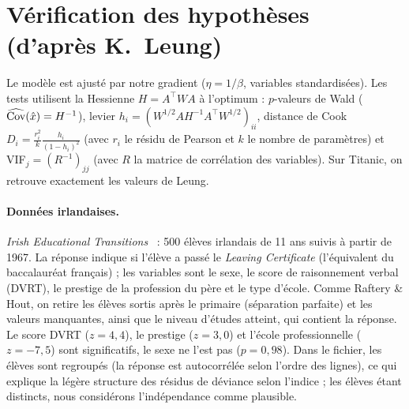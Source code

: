 \documentclass[a4paper,11pt]{article}
\begin{document}
\section{Vérification des hypothèses (d'après K.~Leung)}
Le modèle est ajusté par notre gradient ($\eta=1/\beta$, variables standardisées). Les tests utilisent la Hessienne
$H=A^\top WA$ à l'optimum : $p$-valeurs de Wald ($\widehat{\rm Cov}(\hat x)=H^{-1}$), levier
$h_i=(W^{1/2}AH^{-1}A^\top W^{1/2})_{ii}$, distance de Cook $D_i=\frac{r_i^2}{k}\frac{h_i}{(1-h_i)^2}$ (avec
$r_i$ le résidu de Pearson et $k$ le nombre de paramètres) et VIF$_j=(R^{-1})_{jj}$ (avec $R$ la matrice de
corrélation des variables). Sur Titanic, on retrouve exactement les valeurs de Leung.

\paragraph{Données irlandaises.} \emph{Irish Educational Transitions}~\cite{irish} : 500 élèves irlandais de 11 ans
suivis à partir de 1967. La réponse indique si l'élève a passé le \emph{Leaving Certificate} (l'équivalent du baccalauréat français) ; les variables sont le
sexe, le score de raisonnement verbal (DVRT), le prestige de la profession du père et le type d'école. Comme
Raftery \& Hout, on retire les élèves sortis après le primaire (séparation parfaite) et les valeurs manquantes,
ainsi que le niveau d'études atteint, qui contient la réponse. Le score DVRT ($z=4{,}4$), le prestige
($z=3{,}0$) et l'école professionnelle ($z=-7{,}5$) sont significatifs, le sexe ne l'est pas ($p=0{,}98$).
Dans le fichier, les élèves sont regroupés (la réponse est autocorrélée selon l'ordre des lignes), ce qui explique
la légère structure des résidus de déviance selon l'indice ; les élèves étant distincts, nous considérons
l'indépendance comme plausible.
\end{document}
